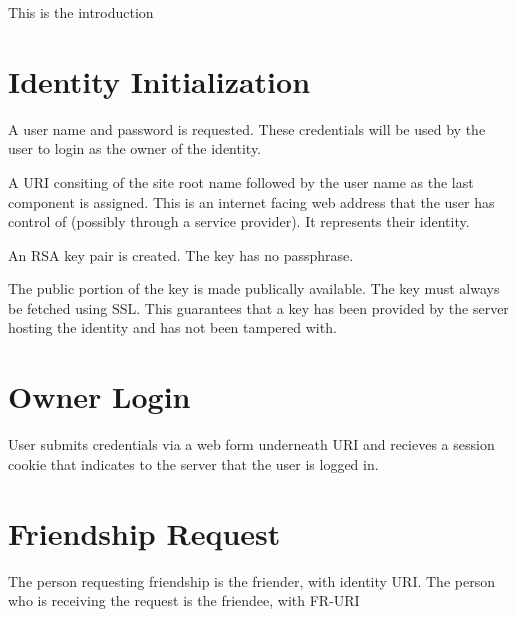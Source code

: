 \documentclass[letterpaper,11pt,oneside]{article}
\begin{document}
This is the introduction

\section{Identity Initialization}

A user name and password is requested. These credentials will be used by the
user to login as the owner of the identity.

A URI consiting of the site root name followed by the user name as the last
component is assigned. This is an internet facing web address that the user has
control of (possibly through a service provider). It represents their identity.

An RSA key pair is created. The key has no passphrase. 

The public portion of the key is made publically available. The key must always
be fetched using SSL. This guarantees that a key has been provided by the
server hosting the identity and has not been tampered with.

\section{Owner Login}

User submits credentials via a web form underneath URI and recieves a session
cookie that indicates to the server that the user is logged in.

\section{Friendship Request}

The person requesting friendship is the friender, with identity URI.
The person who is receiving the request is the friendee, with FR-URI
\end{document}
